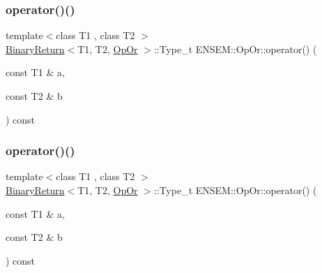 \subsubsection{\texorpdfstring{operator()()}{operator()()}\hspace{0.1cm}{\footnotesize\ttfamily [1/3]}}
{\footnotesize\ttfamily template$<$class T1 , class T2 $>$ \\
\mbox{\hyperlink{structENSEM_1_1BinaryReturn}{Binary\+Return}}$<$T1, T2, \mbox{\hyperlink{structENSEM_1_1OpOr}{Op\+Or}} $>$\+::Type\+\_\+t E\+N\+S\+E\+M\+::\+Op\+Or\+::operator() (\begin{DoxyParamCaption}\item[{const T1 \&}]{a,  }\item[{const T2 \&}]{b }\end{DoxyParamCaption}) const\hspace{0.3cm}{\ttfamily [inline]}}

\mbox{\label{structENSEM_1_1OpOr_a8b897dcdf1e2210e064a33b281a22fc4}} 
\subsubsection{\texorpdfstring{operator()()}{operator()()}\hspace{0.1cm}{\footnotesize\ttfamily [2/3]}}
{\footnotesize\ttfamily template$<$class T1 , class T2 $>$ \\
\mbox{\hyperlink{structENSEM_1_1BinaryReturn}{Binary\+Return}}$<$T1, T2, \mbox{\hyperlink{structENSEM_1_1OpOr}{Op\+Or}} $>$\+::Type\+\_\+t E\+N\+S\+E\+M\+::\+Op\+Or\+::operator() (\begin{DoxyParamCaption}\item[{const T1 \&}]{a,  }\item[{const T2 \&}]{b }\end{DoxyParamCaption}) const\hspace{0.3cm}{\ttfamily [inline]}}

\mbox{\label{structENSEM_1_1OpOr_a8b897dcdf1e2210e064a33b281a22fc4}} 
